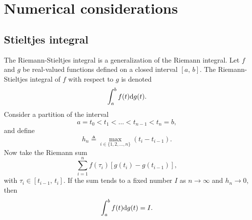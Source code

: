 \chapter{Numerical considerations}
\section{Stieltjes integral} \label{app:stieltjes}
The Riemann-Stieltjes integral is a generalization of the Riemann integral. Let $f$ and $g$ be real-valued functions defined on a closed interval $[a,\,b]$. The Riemann-Stieltjes integral of $f$ with respect to $g$ is denoted 
\begin{equation} \label{eq:stieltjes}
	\int_a^b f(t) \rm dg(t).
\end{equation}
Consider a partition of the interval
\begin{equation}
	a = t_0 < t_1 < \dots < t_{n-1} < t_n = b,
\end{equation}
and define 
\begin{equation}
	h_n \triangleq \max_{i \in \{1,2,\dots,n\}} (t_i - t_{i-1}).
\end{equation}
Now take the Riemann sum
\begin{equation}
	\sum_{i=1}^{n} f(\tau_i)[g(t_i) - g(t_{i-1})],
\end{equation}
with $\tau_i \in [t_{i-1},\,t_i]$. If the sum tends to a fixed number $I$ as $n \rightarrow \infty$ and $h_n \rightarrow 0$, then
\begin{equation}
	\int_a^b f(t) \rm dg(t) = I.
\end{equation}

